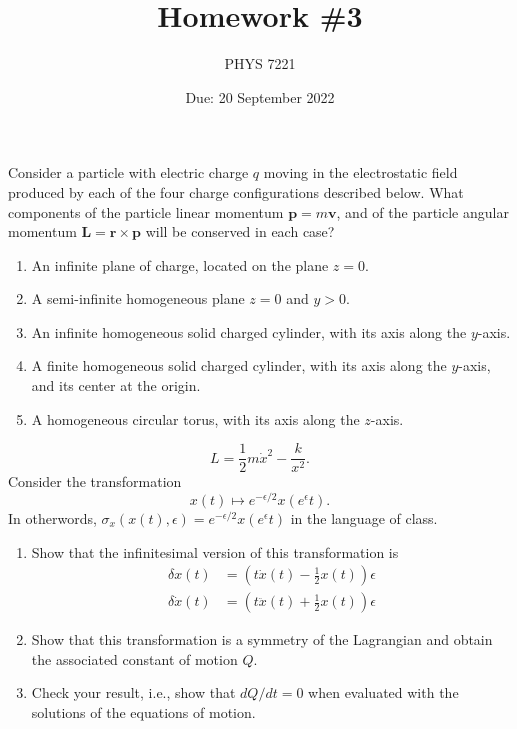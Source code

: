\documentclass{jhwhw}
\author{PHYS 7221}
\title{Homework \#3}
\date{Due: 20 September 2022}
\begin{document}

Consider a particle with electric charge $q$ moving in the electrostatic field produced by each of the four charge configurations described below. What components of the particle linear momentum $\mathbf p = m \mathbf v$, and of the particle angular momentum $\mathbf L = \mathbf r \times \mathbf p$ will be conserved in each case?
\begin{enumerate}
  \item An infinite plane of charge, located on the plane $z = 0$.
  \item A semi-infinite homogeneous plane $z = 0$ and $y > 0$.
  \item An infinite homogeneous solid charged cylinder, with its axis along the $y$-axis.
  \item A finite homogeneous solid charged cylinder, with its axis along the $y$-axis, and its center at the origin.
  \item A homogeneous circular torus, with its axis along the $z$-axis.
\end{enumerate}

\begin{equation}
  \label{eq:27}
  L =  \frac12 m \dot x^{2} - \frac{k}{x^{2}}.
\end{equation}
Consider the transformation
\begin{equation}
  \label{eq:1}
  x(t) \mapsto e^{- \epsilon / 2} x( e^{\epsilon} t ).
\end{equation}
In otherwords, $\sigma_{x}(x(t),\epsilon) = e^{-\epsilon/2} x( e^{\epsilon} t )$ in the language of class.
\begin{enumerate}
  \item Show that the infinitesimal version of this transformation is
        \begin{equation}
          \label{eq:2}
          \begin{aligned}
            \delta x(t) & = \left( t \dot x(t) - \frac12 x(t) \right) \epsilon \\
              \delta \dot x(t) & = \left( t \ddot x(t) + \frac12 x(t) \right) \epsilon
          \end{aligned}
        \end{equation}
  \item Show that this transformation is a symmetry of the Lagrangian and obtain the associated constant of motion $Q$.
  \item Check your result, i.e., show that $dQ/dt = 0$ when evaluated with the solutions of the equations of motion.
\end{enumerate}
\end{document}

